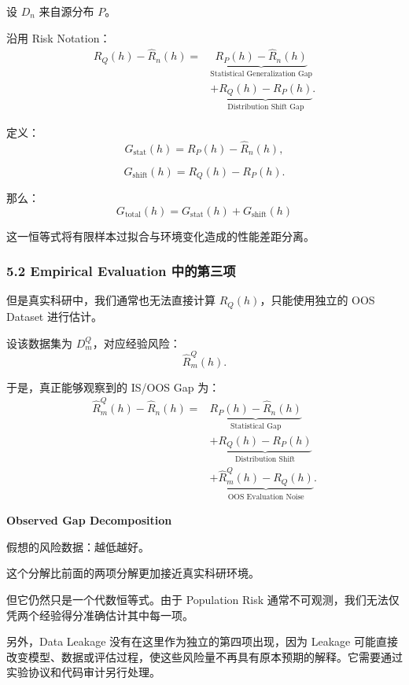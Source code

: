 设 \(D_n\) 来自源分布 \(P\)。

沿用 Risk Notation：
\[\boxed{
\begin{aligned}
R_Q(h)-\widehat R_n(h)
={}&
\underbrace{
R_P(h)-\widehat R_n(h)
}_{\text{Statistical Generalization Gap}}\\
&+
\underbrace{
R_Q(h)-R_P(h)
}_{\text{Distribution Shift Gap}}.
\end{aligned}
}\]

定义：
\[G_{\mathrm{stat}}(h)
=
R_P(h)-\widehat R_n(h),\]

\[G_{\mathrm{shift}}(h)
=
R_Q(h)-R_P(h).\]

那么：
\[\boxed{
G_{\mathrm{total}}(h)
=
G_{\mathrm{stat}}(h)+G_{\mathrm{shift}}(h)
}\]

这一恒等式将有限样本过拟合与环境变化造成的性能差距分离。

\hypertarget{part-2-23-0001-empirical-evaluation-ux4e2dux7684ux7b2cux4e09ux9879}{%
\subsubsection{5.2 Empirical Evaluation 中的第三项}\label{part-2-23-0001-empirical-evaluation-ux4e2dux7684ux7b2cux4e09ux9879}}

但是真实科研中，我们通常也无法直接计算 \(R_Q(h)\)，只能使用独立的 OOS Dataset 进行估计。

设该数据集为 \(D_m^Q\)，对应经验风险：
\[\widehat R_m^Q(h).\]

于是，真正能够观察到的 IS/OOS Gap 为：
\[\boxed{
\begin{aligned}
\widehat R_m^Q(h)-\widehat R_n(h)
={}&
\underbrace{
R_P(h)-\widehat R_n(h)
}_{\text{Statistical Gap}}\\
&+
\underbrace{
R_Q(h)-R_P(h)
}_{\text{Distribution Shift}}\\
&+
\underbrace{
\widehat R_m^Q(h)-R_Q(h)
}_{\text{OOS Evaluation Noise}}.
\end{aligned}
}\]

\textbf{Observed Gap Decomposition}

假想的风险数据：越低越好。


这个分解比前面的两项分解更加接近真实科研环境。

但它仍然只是一个代数恒等式。由于 Population Risk 通常不可观测，我们无法仅凭两个经验得分准确估计其中每一项。

另外，Data Leakage 没有在这里作为独立的第四项出现，因为 Leakage 可能直接改变模型、数据或评估过程，使这些风险量不再具有原本预期的解释。它需要通过实验协议和代码审计另行处理。

